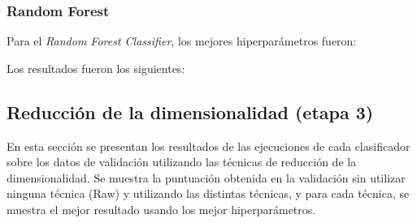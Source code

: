 \subsubsection{Random Forest}
Para el \emph{Random Forest Classifier}, los mejores hiperpar\'ametros fueron:
\begin{itemize}
\end{itemize}
Los resultados fueron los siguientes:




\subsection{Reducción de la dimensionalidad (etapa 3)}

En esta secci\'on se presentan los resultados de las ejecuciones de cada clasificador sobre los datos de validaci\'on utilizando las t\'ecnicas de reducci\'on de la dimensionalidad.
Se muestra la puntuaci\'on obtenida en la validaci\'on sin utilizar ninguna t\'ecnica (Raw) y utilizando las distintas t\'ecnicas, y para cada t\'ecnica, se muestra el mejor resultado usando los mejor hiperpar\'ametros.





